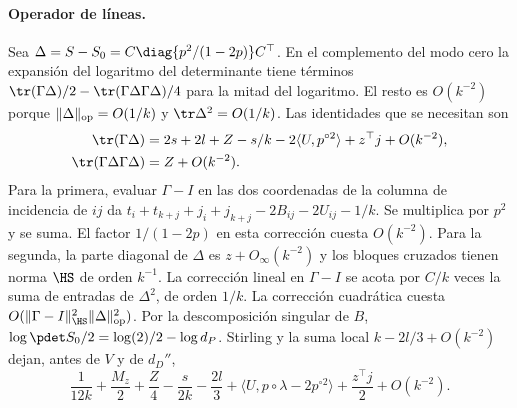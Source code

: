 \paragraph{Operador de líneas.}
Sea $\Delta=S-S_0=C\diag\{p^2/(1-2p)\}C^\top$.
En el complemento del modo cero la expansión del logaritmo del determinante tiene términos
$\tr(\Gamma\Delta)/2-\tr(\Gamma\Delta\Gamma\Delta)/4$ para la mitad del logaritmo.
El resto es $O(k^{-2})$ porque $\|\Delta\|_{\rm op}=O(1/k)$ y $\tr\Delta^2=O(1/k)$.
Las identidades que se necesitan son
\begin{align*}
 \tr(\Gamma\Delta)&=2s+2l+Z-s/k-2\langle U,p^{\circ2}\rangle+z^\top j+O(k^{-2}),\\
 \tr(\Gamma\Delta\Gamma\Delta)&=Z+O(k^{-2}).
\end{align*}
Para la primera, evaluar $\Gamma-I$ en las dos coordenadas de la columna de incidencia de $ij$
da $t_i+t_{k+j}+j_i+j_{k+j}-2B_{ij}-2U_{ij}-1/k$. Se multiplica por $p^2$ y se suma.
El factor $1/(1-2p)$ en esta corrección cuesta $O(k^{-2})$.
Para la segunda, la parte diagonal de $\Delta$ es $z+O_\infty(k^{-2})$ y los bloques
cruzados tienen norma $\HS$ de orden $k^{-1}$. La corrección lineal en $\Gamma-I$ se acota
por $C/k$ veces la suma de entradas de $\Delta^2$, de orden $1/k$.
La corrección cuadrática cuesta $O(\|\Gamma-I\|_{\HS}^2\|\Delta\|_{\rm op}^2)$.
Por la descomposición singular de $B$, $\log\pdet S_0/2=\log(2)/2-\log d_P$.
Stirling y la suma local $k-2l/3+O(k^{-2})$ dejan, antes de $V$ y de $d_D''$,
\[
 \frac1{12k}+\frac{M_z}2+\frac Z4-\frac{s}{2k}-\frac{2l}3+
 \langle U,p\circ\lambda-2p^{\circ2}\rangle+\frac{z^\top j}2+O(k^{-2}).
\]
